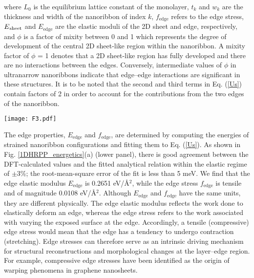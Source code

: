 \documentclass[aps,prl,preprint,11pt,superscriptaddress,bibnotes,amsmath,amssymb,amsfonts,showkeys]{revtex4-2}
\begin{document}
where $L_{0}$ is the equilibrium lattice constant of the monolayer, $t_{k}$ and $w_{k}$ are the thickness and width of the nanoribbon of index $k$, $f_{\text{edge}}$ refers to the edge stress, $E\textsubscript{sheet}$ and $E_{\text{edge}}$ are the elastic moduli of the 2D sheet and edge, respectively, and $\phi$ is a factor of mixity between 0 and 1 which represents the degree of development of the central 2D sheet-like region within the nanoribbon. A mixity factor of $\phi$ = 1 denotes that a 2D sheet-like region has fully developed and there are no interactions between the edges. Conversely, intermediate values of $\phi$ in ultranarrow nanoribbons indicate that edge--edge interactions are significant in these structures. It is to be noted that the second and third terms in Eq. (\ref{Us}) contain factors of 2 in order to account for the contributions from the two edges of the nanoribbon.

\begin{figure*}
\texttt{[image: F3.pdf]}
\caption{(a) Upper panel: Schematic of a (BA)$_2$PbI$_4$ nanoribbon (top view) under axial strain. The rectangle marks one unit cell of the structure which contains the free edges (green) and a central 2D sheet-like region (red). Lower panel: Evolution of the strain energy with strain. The dash-dotted lines denote the respective fits of the data to the analytical relation defined by Eq. (\ref{Us}). (b) Compressive forces $\tau_{\text{ext}}$ exerted on a planar sheet by edges with tensile edge stresses. The insets illustrate the 2D structure of (BA)$_2$PbI$_4$, and voids at the layer--edge region. \label{1DHRPP_energetics}}
\end{figure*}

The edge properties, $E_{\text{edge}}$ and $f_{\text{edge}}$, are determined by computing the energies of strained nanoribbon configurations and fitting them to Eq. (\ref{Us}). As shown in Fig. \ref{1DHRPP_energetics}(a) (lower panel), there is good agreement between the DFT-calculated values and the fitted analytical relation within the elastic regime of $\pm$3\%; the root-mean-square error of the fit is less than 5 meV. We find that the edge elastic modulus $E_{\text{edge}}$ is 0.2651 eV/\AA$^2$, while the edge stress $f_{\text{edge}}$ is tensile and of magnitude 0.0108 eV/\AA$^2$. Although $E_{\text{edge}}$ and $f_{\text{edge}}$ have the same units, they are different physically. The edge elastic modulus reflects the work done to elastically deform an edge, whereas the edge stress refers to the work associated with varying the exposed surface at the edge.\cite{Cedstr94} Accordingly, a tensile (compressive) edge stress would mean that the edge has a tendency to undergo contraction (stretching). Edge stresses can therefore serve as an intrinsic driving mechanism for structural reconstructions and morphological changes at the layer--edge region. For example, compressive edge stresses have been identified as the origin of warping phenomena in graphene nanosheets.\cite{HLedgegr09,SRedgegr08}
\end{document}
